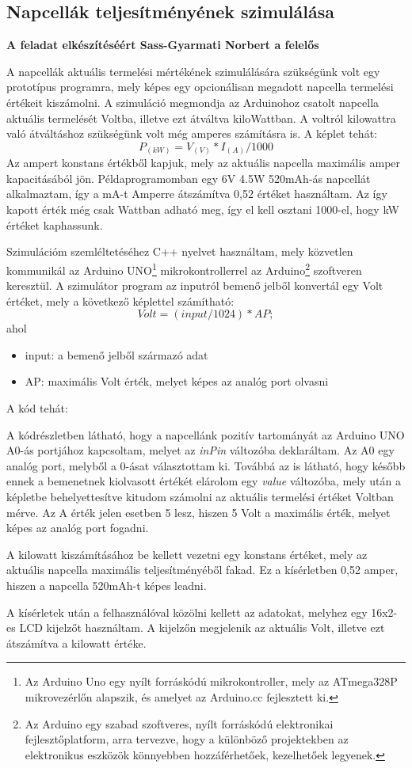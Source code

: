 \documentclass[
]{thesis-ekf}
\theoremstyle{definition}
\theoremstyle{remark}
\begin{document}
		\subsection{Napcellák teljesítményének szimulálása}
			\par \textbf{A feladat elkészítéséért Sass-Gyarmati Norbert a felelős}
			\par A napcellák aktuális termelési mértékének szimulálására szükségünk volt egy prototípus programra, mely képes egy opcionálisan megadott napcella termelési értékeit kiszámolni. A szimuláció megmondja az Arduinohoz csatolt napcella aktuális termelését Voltba, illetve ezt átváltva kiloWattban. A voltról kilowattra való átváltáshoz szükségünk volt még amperes számításra is. A képlet tehát:
			\[P_{(kW)} = V_{(V)} * I_{(A)} / 1000\]
			Az ampert konstans értékből kapjuk, mely az aktuális napcella maximális amper kapacitásából jön. Példaprogramomban egy 6V 4.5W 520mAh-ás napcellát alkalmaztam, így a mA-t Amperre átszámítva 0,52 értéket használtam. Az így kapott érték még csak Wattban adható meg, így el kell osztani 1000-el, hogy kW értéket kaphassunk.
			\par Szimulációm szemléltetéséhez C++ nyelvet használtam, mely közvetlen kommunikál az Arduino UNO\footnote{Az Arduino Uno egy nyílt forráskódú mikrokontroller, mely az ATmega328P mikrovezérlőn alapszik, és amelyet az Arduino.cc fejlesztett ki.\cite{uno}} mikrokontrollerrel az Arduino\footnote{Az Arduino egy szabad szoftveres, nyílt forráskódú elektronikai fejlesztőplatform, arra tervezve, hogy a különböző projektekben az elektronikus eszközök könnyebben hozzáférhetőek, kezelhetőek legyenek.\cite{arduino}} szoftveren keresztül. A szimulátor program az inputról bemenő jelből konvertál egy Volt értéket, mely a következő képlettel számítható:
			\[Volt = (input / 1024) * AP;\]
			ahol
			\begin{itemize}
				\item input: a bemenő jelből származó adat
				\item AP: maximális Volt érték, melyet képes az analóg port olvasni
			\end{itemize}
			A kód tehát:
						
			A kódrészletben látható, hogy a napcellánk pozitív tartományát az Arduino UNO A0-ás portjához kapcsoltam, melyet az \textit{inPin} változóba deklaráltam. Az A0 egy analóg port, melyből a 0-ásat választottam ki. Továbbá az is látható, hogy később ennek a bemenetnek kiolvasott értékét elárolom egy \textit{value} változóba, mely után a képletbe behelyettesítve kitudom számolni az aktuális termelési értéket Voltban mérve. Az A érték jelen esetben 5 lesz, hiszen 5 Volt a maximális érték, melyet képes az analóg port fogadni.
			\par A kilowatt kiszámításához be kellett vezetni egy konstans értéket, mely az aktuális napcella maximális teljesítményéből fakad. Ez a kísérletben 0,52 amper, hiszen a napcella 520mAh-t képes leadni. 
			\par A kísérletek után a felhasználóval közölni kellett az adatokat, melyhez egy 16x2-es LCD kijelzőt használtam. A kijelzőn megjelenik az aktuális Volt, illetve ezt átszámítva a kilowatt értéke.
			
\end{document}
